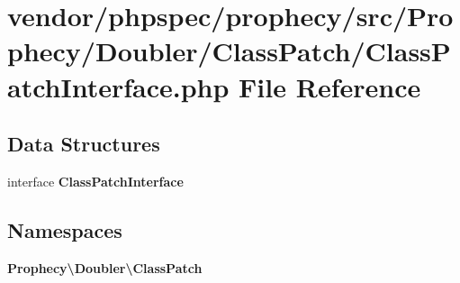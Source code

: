 \section{vendor/phpspec/prophecy/src/\+Prophecy/\+Doubler/\+Class\+Patch/\+Class\+Patch\+Interface.php File Reference}
\label{_class_patch_interface_8php}
\subsection*{Data Structures}
\begin{DoxyCompactItemize}
\item 
interface {\bf Class\+Patch\+Interface}
\end{DoxyCompactItemize}
\subsection*{Namespaces}
\begin{DoxyCompactItemize}
\item 
 {\bf Prophecy\textbackslash{}\+Doubler\textbackslash{}\+Class\+Patch}
\end{DoxyCompactItemize}
